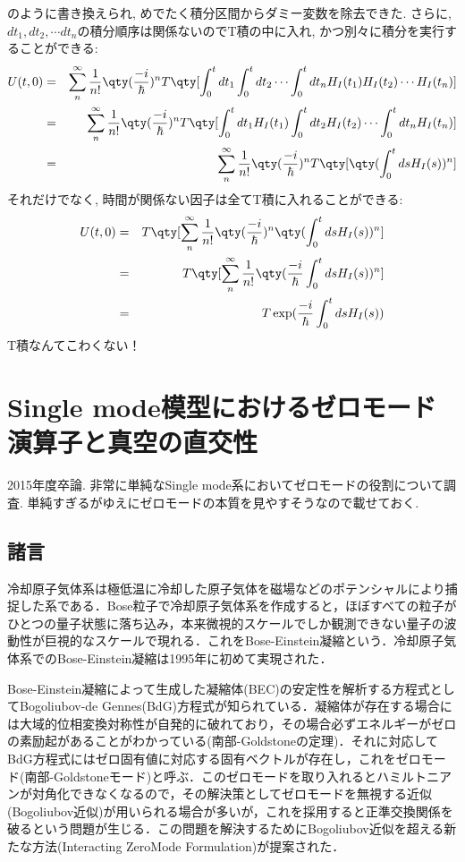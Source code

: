 \documentclass[10.5pt,a4paper]{jreport}
\begin{document}
のように書き換えられ, めでたく積分区間からダミー変数を除去できた. さらに, $dt_1, dt_2, \cdots dt_n$の積分順序は関係ないのでT積の中に入れ, かつ別々に積分を実行することができる:
\begin{eqnarray}
  U(t, 0) &=& \sum_{n}^\infty\frac{1}{n!}\qty(\frac{-i}{\hbar})^nT\qty[\int_0^t dt_1 \int_0^{t} dt_2\cdots\int_0^{t} dt_nH_I(t_1)H_I(t_2)\cdots H_I(t_n)]\\
  &=& \sum_{n}^\infty\frac{1}{n!}\qty(\frac{-i}{\hbar})^nT\qty[\int_0^t dt_1H_I(t_1) \int_0^{t} dt_2H_I(t_2)\cdots\int_0^{t} dt_nH_I(t_n)]\\
  &=& \sum_{n}^\infty\frac{1}{n!}\qty(\frac{-i}{\hbar})^nT\qty[\qty(\int_0^t ds H_I(s))^n]
\end{eqnarray}
それだけでなく, 時間が関係ない因子は全てT積に入れることができる:
\begin{eqnarray}
  U(t, 0) &=& T\qty[\sum_{n}^\infty\frac{1}{n!}\qty(\frac{-i}{\hbar})^n\qty(\int_0^t ds H_I(s))^n]\\
  &=& T\qty[\sum_{n}^\infty\frac{1}{n!}\qty(\frac{-i}{\hbar}\int_0^t ds H_I(s))^n]\\
  &=& T\exp(\frac{-i}{\hbar}\int_0^t ds H_I(s))
\end{eqnarray}
T積なんてこわくない！
\newpage
\chapter{Single mode模型におけるゼロモード演算子と真空の直交性}
2015年度卒論. 非常に単純なSingle mode系においてゼロモードの役割について調査. 単純すぎるがゆえにゼロモードの本質を見やすそうなので載せておく. 
\section{諸言}
冷却原子気体系は極低温に冷却した原子気体を磁場などのポテンシャルにより捕捉した系である．Bose粒子で冷却原子気体系を作成すると，ほぼすべての粒子がひとつの量子状態に落ち込み，本来微視的スケールでしか観測できない量子の波動性が巨視的なスケールで現れる．これをBose-Einstein凝縮という．冷却原子気体系でのBose-Einstein凝縮は1995年に初めて実現された\cite{BEC}．

Bose-Einstein凝縮によって生成した凝縮体(BEC)の安定性を解析する方程式としてBogoliubov-de Gennes(BdG)方程式\cite{bogoliubov,de-gennes}が知られている．凝縮体が存在する場合には大域的位相変換対称性が自発的に破れており，その場合必ずエネルギーがゼロの素励起があることがわかっている(南部-Goldstoneの定理)\cite{nambu,goldstone}．それに対応してBdG方程式にはゼロ固有値に対応する固有ベクトルが存在し，これをゼロモード(南部-Goldstoneモード)と呼ぶ\cite{lewenstein,matsumoto,mine}．このゼロモードを取り入れるとハミルトニアンが対角化できなくなるので，その解決策としてゼロモードを無視する近似(Bogoliubov近似)が用いられる場合が多いが，これを採用すると正準交換関係を破るという問題が生じる．この問題を解決するためにBogoliubov近似を超える新たな方法(Interacting ZeroMode Formulation)が提案された\cite{nakamura}．
\end{document}

